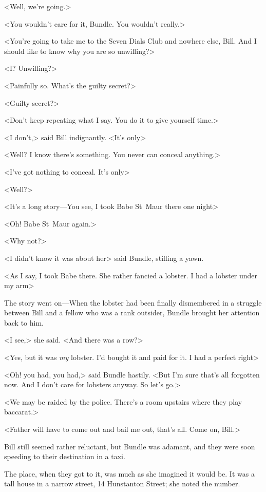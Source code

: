 <Well, we're going.>

<You wouldn't care for it, Bundle. You wouldn't really.>

<You're going to take me to the Seven Dials Club and nowhere else, Bill. And I should like to know why you are so unwilling?>

<I? Unwilling?>

<Painfully so. What's the guilty secret?>

<Guilty secret?>

<Don't keep repeating what I say. You do it to give yourself time.>

<I don't,> said Bill indignantly. <It's only\longdash>

<Well? I know there's something. You never can conceal anything.>

<I've got nothing to conceal. It's only\longdash>

<Well?>

<It's a long story—You see, I took Babe St~Maur there one night\longdash>

<Oh! Babe St~Maur again.>

<Why not?>

<I didn't know it was about her\longdash> said Bundle, stifling a yawn.

<As I say, I took Babe there. She rather fancied a lobster. I had a lobster under my arm\longdash>

The story went on—When the lobster had been finally dismembered in a struggle between Bill and a fellow who was a rank outsider, Bundle brought her attention back to him.

<I see,> she said. <And there was a row?>

<Yes, but it was \emph{my} lobster. I'd bought it and paid for it. I had a perfect right\longdash>

<Oh! you had, you had,> said Bundle hastily. <But I'm sure that's all forgotten now. And I don't care for lobsters anyway. So let's go.>

<We may be raided by the police. There's a room upstairs where they play baccarat.>

<Father will have to come out and bail me out, that's all. Come on, Bill.>

Bill still seemed rather reluctant, but Bundle was adamant, and they were soon speeding to their destination in a taxi.

The place, when they got to it, was much as she imagined it would be. It was a tall house in a narrow street, 14 Hunstanton Street; she noted the number.

